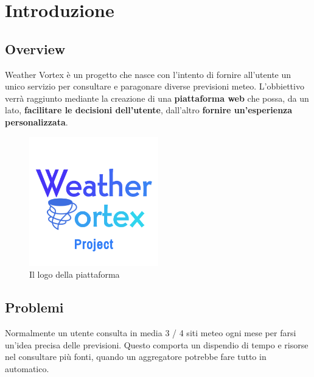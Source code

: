 

\chapter{Introduzione}


\section{Overview}
Weather Vortex è un progetto che nasce con l'intento di fornire all'utente un unico servizio per consultare e paragonare diverse previsioni meteo. L'obbiettivo verrà raggiunto mediante la creazione di una \textbf{piattaforma web} che possa, da un lato, \textbf{facilitare le decisioni dell'utente}, dall'altro \textbf{fornire un'esperienza personalizzata}.

\begin{figure}[H]
    \caption{Il logo della piattaforma}
    \label{fig:Logo}
    \centering
    \includegraphics[width=0.5\textwidth]{Images/logo.png}
\end{figure}

\section{Problemi}
Normalmente un utente consulta in media 3 / 4 siti meteo ogni mese per farsi un'idea precisa delle previsioni. Questo comporta un dispendio di tempo e risorse nel consultare più fonti, quando un aggregatore potrebbe fare tutto in automatico.

